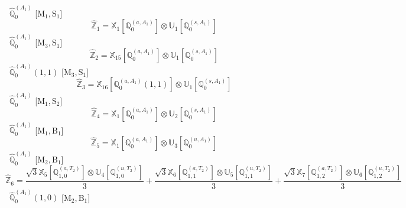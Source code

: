 \documentclass[fleqn,10pt,landscape]{article}
\begin{document}
\begin{itemize}
\vspace{4mm}
\noindent {} $\,\,\,\hat{\mathbb{Q}}_{0}^{(A_{1})}$ [M$_{1}$,\,S$_{1}$]
\begin{dmath*}
\hat{\mathbb{Z}}_{1}=\mathbb{X}_{1}[\mathbb{Q}_{0}^{(a,A_{1})}] \otimes\mathbb{U}_{1}[\mathbb{Q}_{0}^{(s,A_{1})}]
\end{dmath*}
\vspace{4mm}
\noindent {} $\,\,\,\hat{\mathbb{Q}}_{0}^{(A_{1})}$ [M$_{3}$,\,S$_{1}$]
\begin{dmath*}
\hat{\mathbb{Z}}_{2}=\mathbb{X}_{15}[\mathbb{Q}_{0}^{(a,A_{1})}] \otimes\mathbb{U}_{1}[\mathbb{Q}_{0}^{(s,A_{1})}]
\end{dmath*}
\vspace{4mm}
\noindent {} $\,\,\,\hat{\mathbb{Q}}_{0}^{(A_{1})}(1,1)$ [M$_{3}$,\,S$_{1}$]
\begin{dmath*}
\hat{\mathbb{Z}}_{3}=\mathbb{X}_{16}[\mathbb{Q}_{0}^{(a,A_{1})}(1,1)] \otimes\mathbb{U}_{1}[\mathbb{Q}_{0}^{(s,A_{1})}]
\end{dmath*}
\vspace{4mm}
\noindent {} $\,\,\,\hat{\mathbb{Q}}_{0}^{(A_{1})}$ [M$_{1}$,\,S$_{2}$]
\begin{dmath*}
\hat{\mathbb{Z}}_{4}=\mathbb{X}_{1}[\mathbb{Q}_{0}^{(a,A_{1})}] \otimes\mathbb{U}_{2}[\mathbb{Q}_{0}^{(s,A_{1})}]
\end{dmath*}
\vspace{4mm}
\noindent {} $\,\,\,\hat{\mathbb{Q}}_{0}^{(A_{1})}$ [M$_{1}$,\,B$_{1}$]
\begin{dmath*}
\hat{\mathbb{Z}}_{5}=\mathbb{X}_{1}[\mathbb{Q}_{0}^{(a,A_{1})}] \otimes\mathbb{U}_{3}[\mathbb{Q}_{0}^{(u,A_{1})}]
\end{dmath*}
\vspace{4mm}
\noindent {} $\,\,\,\hat{\mathbb{Q}}_{0}^{(A_{1})}$ [M$_{2}$,\,B$_{1}$]
\begin{dmath*}
\hat{\mathbb{Z}}_{6}=\frac{\sqrt{3} \mathbb{X}_{5}[\mathbb{Q}_{1,0}^{(a,T_{2})}] \otimes\mathbb{U}_{4}[\mathbb{Q}_{1,0}^{(u,T_{2})}]}{3} + \frac{\sqrt{3} \mathbb{X}_{6}[\mathbb{Q}_{1,1}^{(a,T_{2})}] \otimes\mathbb{U}_{5}[\mathbb{Q}_{1,1}^{(u,T_{2})}]}{3} + \frac{\sqrt{3} \mathbb{X}_{7}[\mathbb{Q}_{1,2}^{(a,T_{2})}] \otimes\mathbb{U}_{6}[\mathbb{Q}_{1,2}^{(u,T_{2})}]}{3}
\end{dmath*}
\vspace{4mm}
\noindent {} $\,\,\,\hat{\mathbb{Q}}_{0}^{(A_{1})}(1,0)$ [M$_{2}$,\,B$_{1}$]
\begin{dmath*}

\end{dmath*}
\end{itemize}
\end{document}
